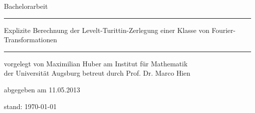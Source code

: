 \begin{titlepage}
  \thispagestyle{empty}
  \newcommand{\Rule}{\rule{\textwidth}{1mm}}
  \begin{center}\sffamily
    \normalfont\sffamily\large
    Bachelorarbeit
    \Rule
    \vspace{5mm}
    \Huge
    {Explizite Berechnung der Levelt-Turittin-Zerlegung einer Klasse
      von Fourier-Transformationen}
    \vspace{1mm}
    \Rule
  \end{center}
    \vfill
    \normalfont\sffamily\large vorgelegt von
    \Large Maximilian Huber
    \vfill
    \normalfont\sffamily\large am
    \Large Institut für Mathematik\\
    \normalfont\sffamily\large der
    \Large Universität Augsburg
    \vfill
    \normalfont\sffamily\large betreut durch 
    \Large Prof. Dr. Marco Hien \par
    \vfill
    \normalfont\sffamily\large abgegeben am 
    \Large 11.05.2013\\
  \ifnum{}
    \begin{center}
      \normalfont\sffamily\large stand: \today
    \end{center}
  \fi
\end{titlepage}
